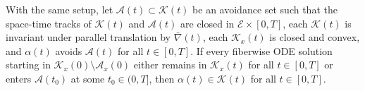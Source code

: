 \begin{theorem}
\label{ch04-thm-tensor-max-principle-avoidance}

With the same setup, let \(\mathcal A(t)\subset\mathcal K(t)\) be an avoidance set such that the space-time tracks of \(\mathcal K(t)\) and \(\mathcal A(t)\) are closed in \(\mathcal E\times[0,T]\), each \(\mathcal K(t)\) is invariant under parallel translation by \(\bar\nabla(t)\), each \(\mathcal K_x(t)\) is closed and convex, and \(\alpha(t)\) avoids \(\mathcal A(t)\) for all \(t\in[0,T]\). If every fiberwise ODE solution starting in \(\mathcal K_x(0)\setminus\mathcal A_x(0)\) either remains in \(\mathcal K_x(t)\) for all \(t\in[0,T]\) or enters \(\mathcal A(t_0)\) at some \(t_0\in(0,T]\), then \(\alpha(t)\in\mathcal K(t)\) for all \(t\in[0,T]\).
\end{theorem}
